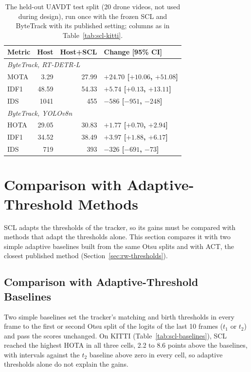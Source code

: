 \begin{table}[tbp]
\centering
\caption{The held-out UAVDT test split (20 drone videos, not used during design), run once with the frozen SCL and ByteTrack with its published setting; columns as in Table~\ref{tab:scl-kitti}.}
\label{tab:scl-uavdt}
\begin{tabular}{lrrl}
\toprule
Metric & Host & Host+SCL & Change [95\% CI]\\
\midrule
\multicolumn{4}{l}{\textit{ByteTrack, RT-DETR-L} \cite{zhang2022bytetrack,zhao2024rtdetr}}\\
\quad MOTA & 3.29 & 27.99 & \textbf{$+24.70$ [$+10.06$, $+51.08$]}\\
\quad IDF1 & 48.59 & 54.33 & \textbf{$+5.74$ [$+0.13$, $+13.11$]}\\
\quad IDS & 1041 & 455 & \textbf{$-586$ [$-951$, $-248$]}\\
\multicolumn{4}{l}{\textit{ByteTrack, YOLOv8n} \cite{zhang2022bytetrack,jocher2023yolov8}}\\
\quad HOTA & 29.05 & 30.83 & \textbf{$+1.77$ [$+0.70$, $+2.94$]}\\
\quad IDF1 & 34.52 & 38.49 & \textbf{$+3.97$ [$+1.88$, $+6.17$]}\\
\quad IDS & 719 & 393 & \textbf{$-326$ [$-691$, $-73$]}\\
\bottomrule
\end{tabular}
\end{table}

\section{Comparison with Adaptive-Threshold Methods}\label{sec:scl-compare}
SCL adapts the thresholds of the tracker, so its gains must be compared with methods that adapt the thresholds alone. This section compares it with two simple adaptive baselines built from the same Otsu splits and with ACT, the closest published method (Section~\ref{sec:rw-thresholds}).

\subsection{Comparison with Adaptive-Threshold Baselines}\label{sec:scl-baselines}
Two simple baselines set the tracker's matching and birth thresholds in every frame to the first or second Otsu split of the logits of the last 10 frames ($t_1$ or $t_2$) and pass the scores unchanged. On KITTI (Table~\ref{tab:scl-baselines}), SCL reached the highest HOTA in all three cells, 2.2 to 8.6 points above the baselines, with intervals against the $t_2$ baseline above zero in every cell, so adaptive thresholds alone do not explain the gains.

